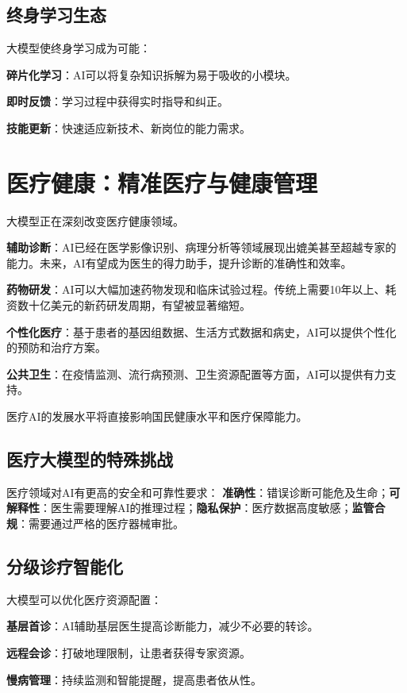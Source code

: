 \subsection{终身学习生态}

大模型使终身学习成为可能：

\textbf{碎片化学习}：AI可以将复杂知识拆解为易于吸收的小模块。

\textbf{即时反馈}：学习过程中获得实时指导和纠正。

\textbf{技能更新}：快速适应新技术、新岗位的能力需求。

\section{医疗健康：精准医疗与健康管理}

大模型正在深刻改变医疗健康领域。

\textbf{辅助诊断}：AI已经在医学影像识别、病理分析等领域展现出媲美甚至超越专家的能力。未来，AI有望成为医生的得力助手，提升诊断的准确性和效率。

\textbf{药物研发}：AI可以大幅加速药物发现和临床试验过程。传统上需要10年以上、耗资数十亿美元的新药研发周期，有望被显著缩短。

\textbf{个性化医疗}：基于患者的基因组数据、生活方式数据和病史，AI可以提供个性化的预防和治疗方案。

\textbf{公共卫生}：在疫情监测、流行病预测、卫生资源配置等方面，AI可以提供有力支持。

医疗AI的发展水平将直接影响国民健康水平和医疗保障能力。

\subsection{医疗大模型的特殊挑战}

医疗领域对AI有更高的安全和可靠性要求：
\textbf{准确性}：错误诊断可能危及生命；\textbf{可解释性}：医生需要理解AI的推理过程；\textbf{隐私保护}：医疗数据高度敏感；\textbf{监管合规}：需要通过严格的医疗器械审批。

\subsection{分级诊疗智能化}

大模型可以优化医疗资源配置：

\textbf{基层首诊}：AI辅助基层医生提高诊断能力，减少不必要的转诊。

\textbf{远程会诊}：打破地理限制，让患者获得专家资源。

\textbf{慢病管理}：持续监测和智能提醒，提高患者依从性。


